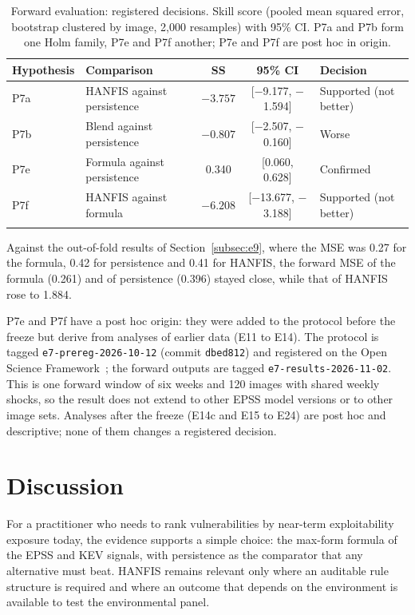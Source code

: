 \documentclass[referee,lineno,pdflatex,sn-basic]{sn-jnl}%
\theoremstyle{thmstyleone}%
\theoremstyle{thmstyletwo}%
\theoremstyle{thmstylethree}%
\begin{document}
\begin{table}[h]
\caption{Forward evaluation: registered decisions. Skill score (pooled mean squared error, bootstrap clustered by image, 2{,}000 resamples) with 95\% CI. P7a and P7b form one Holm family, P7e and P7f another; P7e and P7f are post hoc in origin.}\label{tab:e7-results}
\begin{tabular}{@{}llccl@{}}
\toprule
Hypothesis & Comparison & SS & 95\% CI & Decision \\
\midrule
P7a & HANFIS against persistence & $-3.757$ & [$-$9.177, $-$1.594] & Supported (not better) \\
P7b & Blend against persistence & $-0.807$ & [$-$2.507, $-$0.160] & Worse \\
P7e & Formula against persistence & 0.340 & [0.060, 0.628] & Confirmed \\
P7f & HANFIS against formula & $-6.208$ & [$-$13.677, $-$3.188] & Supported (not better) \\
\botrule
\end{tabular}
\end{table}

Against the out-of-fold results of Section~\ref{subsec:e9}, where the MSE was 0.27 for the formula, 0.42 for persistence and 0.41 for HANFIS, the forward MSE of the formula (0.261) and of persistence (0.396) stayed close, while that of HANFIS rose to 1.884.

P7e and P7f have a post hoc origin: they were added to the protocol before the freeze but derive from analyses of earlier data (E11 to E14). The protocol is tagged \texttt{e7-prereg-2026-10-12} (commit \texttt{dbed812}) and registered on the Open Science Framework~\citep{osf_ahcvs}; the forward outputs are tagged \texttt{e7-results-2026-11-02}. This is one forward window of six weeks and 120 images with shared weekly shocks, so the result does not extend to other EPSS model versions or to other image sets. Analyses after the freeze (E14c and E15 to E24) are post hoc and descriptive; none of them changes a registered decision.

\section{Discussion}\label{sec5}

For a practitioner who needs to rank vulnerabilities by near-term exploitability exposure today, the evidence supports a simple choice: the max-form formula of the EPSS and KEV signals, with persistence as the comparator that any alternative must beat. HANFIS remains relevant only where an auditable rule structure is required and where an outcome that depends on the environment is available to test the environmental panel.
\end{document}
